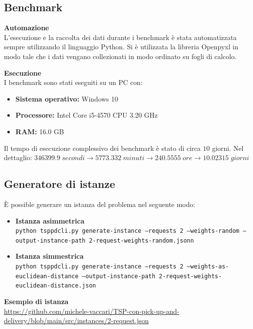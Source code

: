 \documentclass[9pt]{beamer}
\begin{document}
\subsection{Benchmark}
\begin{frame}{\subsecname}

	\textbf{Automazione} \\
	L'esecuzione e la raccolta dei dati durante i benchmark è stata automatizzata sempre utilizzando il linguaggio Python. Si è utilizzata la libreria Openpyxl in modo tale che i dati vengano collezionati in modo ordinato su fogli di calcolo.

	\textbf{Esecuzione} \\
	I benchmark sono stati eseguiti su un PC con:
	\begin{itemize}
		\item
		\textbf{Sistema operativo:} Windows 10
		\item
		\textbf{Processore:} Intel Core i5-4570 CPU  3.20 GHz
		\item
		\textbf{RAM:} 16.0 GB
	\end{itemize}
	Il tempo di esecuzione complessivo dei benchmark è stato di circa $10$ giorni. Nel dettaglio: $346399.9\;secondi \rightarrow 5773.332\;minuti \rightarrow 240.5555\;ore \rightarrow 10.02315\;giorni$

\end{frame}

\subsection{Generatore di istanze}
\begin{frame}[fragile]{\subsecname}

	È possible generare un istanza del problema nel seguente modo:
	\begin{itemize}
		\item
		\textbf{Istanza asimmetrica} \\
		\texttt{python tsppdcli.py generate-instance --requests 2 --weights-random --output-instance-path 2-request-weights-random.jsonn}
		\item
		\textbf{Istanza simmestrica} \\
		\texttt{python tsppdcli.py generate-instance --requests 2 --weights-as-euclidean-distance --output-instance-path 2-request-weights-euclidean-distance.json}
	\end{itemize}

	\textbf{Esempio di istanza} \\
	\href{https://github.com/michele-vaccari/TSP-con-pick-up-and-delivery/blob/main/src/instances/2-request.json}{https://github.com/michele-vaccari/TSP-con-pick-up-and-delivery/blob/main/src/instances/2-request.json}

\end{frame}
\end{document}
